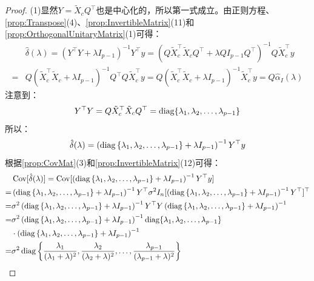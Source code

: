 \begin{proof}
	(1)显然$Y=\tilde{X}_cQ^{\top}$也是中心化的，所以第一式成立。由正则方程、\cref{prop:Transpose}(4)、\cref{prop:InvertibleMatrix}(11)和\cref{prop:OrthogonalUnitaryMatrix}(1)可得：
	\begin{align*}
		&\hat{\delta}(\lambda)=(Y^{\top}Y+\lambda I_{p-1})^{-1}Y^{\top}y=(Q\tilde{X}_c^{\top}\tilde{X}_cQ^{\top}+\lambda QI_{p-1}Q^{\top})^{-1}Q\tilde{X}_c^{\top}y \\
		=&Q(\tilde{X}_c^{\top}\tilde{X}_c+\lambda I_{p-1})^{-1}Q^{\top}Q\tilde{X}_c^{\top}y=Q(\tilde{X}_c^{\top}\tilde{X}_c+\lambda I_{p-1})^{-1}\tilde{X}_c^{\top}y=Q\hat{\alpha}_I(\lambda)
	\end{align*}
	注意到：
	\begin{equation*}
		Y^{\top}Y=Q\tilde{X}_c^{\top}\tilde{X}_cQ^{\top}=\operatorname{diag}\{\lambda_1, \lambda_2, \dots, \lambda_{p-1}\}
	\end{equation*}
	所以：
	\begin{equation*}
		\hat{\delta}(\lambda)=\left(\operatorname{diag}\left\{\lambda_1, \lambda_2, \dots, \lambda_{p-1}\right\}+\lambda I_{p-1}\right)^{-1}Y^{\top}y
	\end{equation*}
	根据\cref{prop:CovMat}(3)和\cref{prop:InvertibleMatrix}(12)可得：
	\begin{align*}
		&\operatorname{Cov}[\hat{\delta}(\lambda)]=\operatorname{Cov}[\left(\operatorname{diag}\left\{\lambda_1, \lambda_2, \dots, \lambda_{p-1}\right\}+\lambda I_{p-1}\right)^{-1}Y^{\top}y] \\
		=&\left(\operatorname{diag}\left\{\lambda_1, \lambda_2, \dots, \lambda_{p-1}\right\}+\lambda I_{p-1}\right)^{-1}Y^{\top}\sigma^2I_n[\left(\operatorname{diag}\left\{\lambda_1, \lambda_2, \dots, \lambda_{p-1}\right\}+\lambda I_{p-1}\right)^{-1}Y^{\top}]^{\top} \\
		=&\sigma^2\left(\operatorname{diag}\left\{\lambda_1, \lambda_2, \dots, \lambda_{p-1}\right\}+\lambda I_{p-1}\right)^{-1}Y^{\top}Y\left(\operatorname{diag}\left\{\lambda_1, \lambda_2, \dots, \lambda_{p-1}\right\}+\lambda I_{p-1}\right)^{-1} \\
		=&\sigma^2\left(\operatorname{diag}\left\{\lambda_1, \lambda_2, \dots, \lambda_{p-1}\right\}+\lambda I_{p-1}\right)^{-1}\operatorname{diag}\{\lambda_1, \lambda_2, \dots, \lambda_{p-1}\} \\
		&\cdot\left(\operatorname{diag}\left\{\lambda_1, \lambda_2, \dots, \lambda_{p-1}\right\}+\lambda I_{p-1}\right)^{-1} \\
		=&\sigma^2\operatorname{diag}\left\{\frac{\lambda_1}{(\lambda_1+\lambda)^2},\frac{\lambda_2}{(\lambda_2+\lambda)^2},\dots,\frac{\lambda_{p-1}}{(\lambda_{p-1}+\lambda)^2}\right\}
	\end{align*}\par

\end{proof}
